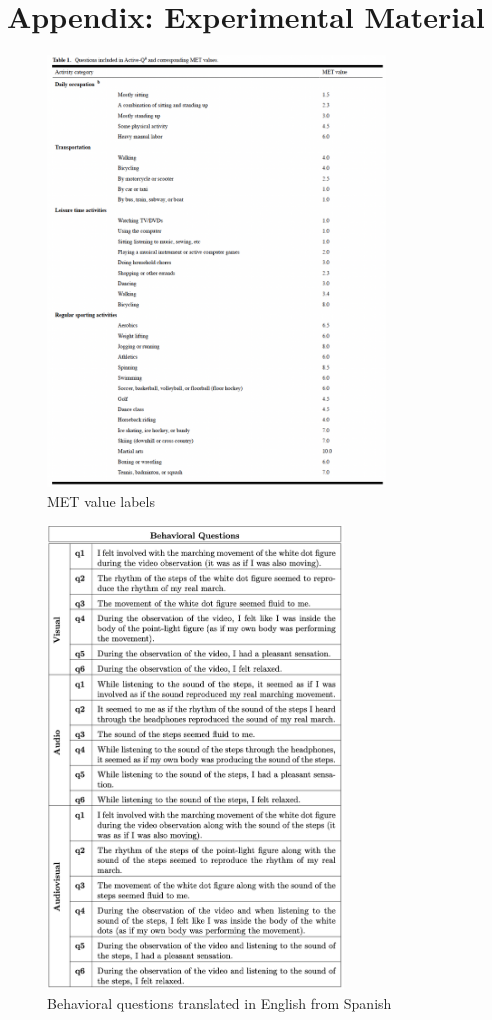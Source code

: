 \appendix

\section{Appendix: Experimental Material}
\begin{figure}[ht]
    \centering
    \includegraphics[width=0.8\textwidth]{appendix/met_values.png}
    \caption{MET value labels \parencite{Bonn_2012}}
    \label{fig: met_values}
\end{figure}
\begin{figure}[ht]
    \centering
    \includegraphics[width=0.70\textwidth]{appendix/questions.png}
    \caption{Behavioral questions translated in English from Spanish}
    \label{fig: Behavioral questions}
\end{figure}
